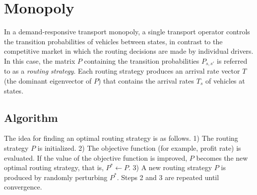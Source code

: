 \documentclass[dissertation,draft*]{aaltoseries}
\begin{document}
\section{Monopoly \cite{kuhmostok}}
\label{monopdescription}
In a demand-responsive transport monopoly, a single transport operator controls the transition probabilities of vehicles
between states, in contrast to the competitive market in which the routing decisions are made by individual drivers.
In this case, the matrix $P$ containing the transition probabilities $P_{s,s'}$ is referred to as a \emph{routing strategy}.
Each routing strategy produces an arrival rate vector $T$ (the dominant eigenvector of $P$) that contains the arrival rates $T_s$ of
vehicles at states.

\subsection{Algorithm}
The idea for finding an optimal routing strategy is as follows.
1) The routing strategy $P$ is initialized. 
2) The objective function (for example, profit rate) is evaluated. 
If the value of the objective function is improved, $P$ becomes the new optimal routing strategy, that is, $P^* \leftarrow P$.
3) A new routing strategy $P$ is produced by randomly perturbing $P^*$.
Steps 2 and 3 are repeated until convergence.
% 
\end{document}
